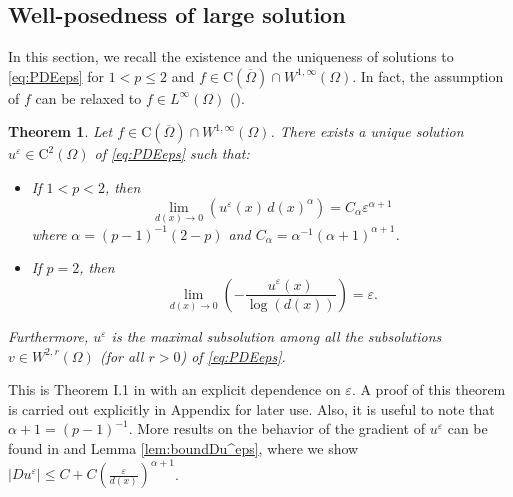 \documentclass[12pt,reqno]{amsart}
\numberwithin{figure}{section}
\theoremstyle{plain}
\newtheorem{thm}{Theorem}[section]
\theoremstyle{remark}
\numberwithin{equation}{section}
\begin{document}




\subsection{Well-posedness of large solution} In this section, we recall the existence and the uniqueness of solutions to \eqref{eq:PDEeps} for $1<p\leq 2$ and $f\in \mathrm{C}(\overline{\Omega})\cap W^{1,\infty}(\Omega)$. In fact, the assumption of $f$ can be relaxed to $f\in L^\infty(\Omega)$ (\cite{Lasry1989}).

\begin{thm}\label{thm:wellposed1<p<2} Let $f\in \mathrm{C}(\overline{\Omega})\cap W^{1,\infty}(\Omega)$. There exists a unique solution $u^\varepsilon\in \mathrm{C}^2(\Omega)$ of \eqref{eq:PDEeps} such that:
\begin{itemize}
    \item[(i)] If $1<p< 2$, then 
\begin{equation}\label{rate_p<2}
    \lim_{d(x)\to 0}\left( u^\varepsilon(x) \,d(x)^\alpha \right)= C_\alpha \varepsilon^{\alpha+1}
\end{equation}
where $\alpha = (p-1)^{-1}(2-p)$ and $C_\alpha = \alpha^{-1}(\alpha+1)^{\alpha+1}$.
\item[(ii)] If $p=2$, then
\begin{equation}\label{rate_p=2}
    \lim_{d(x)\to 0} \left(-\frac{u^\varepsilon(x)}{\log(d(x))}\right) = \varepsilon.
\end{equation}
\end{itemize}
Furthermore, $u^\varepsilon$ is the maximal subsolution among all the subsolutions $v\in W^{2,r}(\Omega)$ (for all $r>0$) of \eqref{eq:PDEeps}.
\end{thm}
\noindent This is Theorem I.1 in \cite{Lasry1989} with an explicit dependence on $\varepsilon$. A proof of this theorem is carried out explicitly in Appendix for later use. Also, it is useful to note that $\alpha+1 = (p-1)^{-1}$. More results on the behavior of the gradient of $u^\varepsilon$ can be found in \cite{alessio_asymptotic_2006} and Lemma \ref{lem:boundDu^eps}, where we show $|Du^\varepsilon|\leq C + C\left(\frac{\varepsilon}{d(x)}\right)^{\alpha+1}$.
\end{document}
